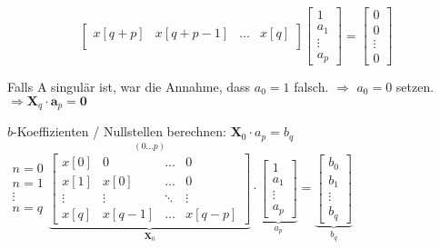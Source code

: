 \begin{aufzaehlung}
$$\begin{bmatrix}
    		x[q+p] & x[q+p-1] & \hdots & x[q] \\
		\end{bmatrix}
		\begin{bmatrix}
    		1 \\
    		a_1 \\
    		\vdots \\
    		a_p
		\end{bmatrix} = 
		\begin{bmatrix}
    		0 \\
    		0 \\
    		\vdots \\
    		0
		\end{bmatrix} 
		$$  \normalsize
		
		\vspace{-0.5cm}
		Falls A singulär ist, war die Annahme, dass $a_0 = 1$ falsch. $\Longrightarrow$ $a_0=0$ setzen. 
		$ \Longrightarrow \bm X_q \cdot \bm a_p = \bm 0$
		
  		\item $b$-Koeffizienten / Nullstellen berechnen: $\bm X_0 \cdot a_p = b_q$ \small \hspace{0.5cm}
		$ \begin{matrix} n=0\\ n=1\\ \vdots\\ n=q \end{matrix} \overset{(0 \hdots p)}{\underbrace{\begin{bmatrix}
    		x[0] & 0 & \hdots & 0 \\
    		x[1] & x[0] & \hdots & 0 \\
    		\vdots & \vdots & \ddots & \vdots \\
    		x[q] & x[q-1] & \hdots & x[q-p]
		\end{bmatrix}  }_{\bm X_0}}\cdot \underbrace{\begin{bmatrix}
    		1 \\
    		a_1 \\
    		\vdots \\
    		a_p
		\end{bmatrix}  }_{a_p}= 	\underbrace{\begin{bmatrix}
	    		b_0 \\
	    		b_1 \\
	    		\vdots \\
	    		b_q
			\end{bmatrix}}_{b_q}$ \normalsize
			
	\end{aufzaehlung}
	
